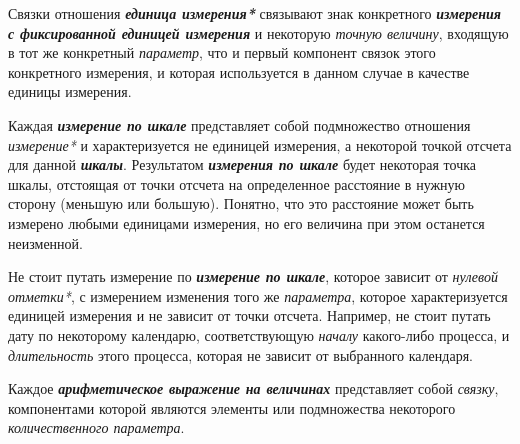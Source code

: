 Связки отношения \textbf{\textit{единица измерения*}} связывают знак конкретного \textbf{\textit{измерения с фиксированной единицей измерения}} и некоторую \textit{точную величину}, входящую в тот же конкретный \textit{параметр}, что и первый компонент связок этого конкретного измерения, и которая используется в данном случае в качестве единицы измерения.
	

\begin{SCn}
\end{SCn}

Каждая \textbf{\textit{измерение по шкале}} представляет собой подмножество отношения \textit{измерение*} и характеризуется не единицей измерения, а некоторой точкой отсчета для данной \textbf{\textit{шкалы}}. Результатом \textbf{\textit{измерения по шкале}} будет некоторая точка шкалы, отстоящая от точки отсчета на определенное расстояние в нужную сторону (меньшую или большую). Понятно, что это расстояние может быть измерено любыми единицами измерения, но его величина при этом останется неизменной.
		
Не стоит путать измерение по \textbf{\textit{измерение по шкале}}, которое зависит от \textit{нулевой отметки*}, с измерением изменения того же \textit{параметра}, которое характеризуется единицей измерения и не зависит от точки отсчета. Например, не стоит путать дату по некоторому календарю, соответствующую \textit{началу} какого-либо процесса, и \textit{длительность} этого процесса, которая не зависит от выбранного календаря.

Каждое \textbf{\textit{арифметическое выражение на величинах}} представляет собой \textit{связку}, компонентами которой являются элементы или подмножества некоторого \textit{количественного параметра}.


\begin{SCn}
	
\end{SCn}	

